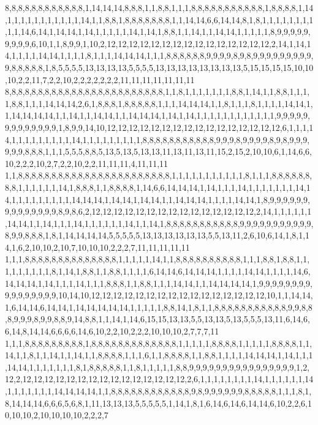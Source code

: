 8,8,8,8,8,8,8,8,8,8,8,8,1,14,14,14,8,8,8,1,1,8,8,1,1,1,8,8,8,8,8,8,8,8,8,8,8,1,8,8,8,8,1,14,1,1,1,1,1,1,1,1,1,1,1,14,1,1,8,8,1,8,8,8,8,8,8,8,1,1,14,14,6,6,14,14,8,1,8,1,1,1,1,1,1,1,1,1,1,14,6,14,1,14,14,1,14,1,1,1,1,1,14,1,14,1,8,8,1,1,14,1,1,14,14,1,1,1,1,1,8,9,9,9,9,9,9,9,9,9,6,10,1,1,8,9,9,1,10,2,12,12,12,12,12,12,12,12,12,12,12,12,12,12,12,2,14,1,14,14,1,1,1,1,14,14,1,1,1,1,8,1,1,1,14,14,14,1,1,1,8,8,8,8,8,8,9,9,9,9,8,9,8,9,9,9,9,9,9,9,9,9,9,8,8,8,8,8,1,8,5,5,5,5,13,13,13,13,5,5,5,5,13,13,13,13,13,13,13,13,5,15,15,15,15,10,10,10,2,2,11,7,2,2,10,2,2,2,2,2,2,2,11,11,11,11,11,11,11
8,8,8,8,8,8,8,8,8,8,8,8,8,8,8,8,8,8,8,8,8,8,8,8,1,1,8,1,1,1,1,1,1,1,8,8,1,14,1,1,8,8,1,1,1,1,8,8,1,1,1,14,14,14,2,6,1,8,8,8,1,8,8,8,8,8,1,1,1,14,14,14,1,1,8,1,1,1,8,1,1,1,1,14,14,1,1,14,14,14,14,1,1,14,1,1,14,14,1,1,14,14,14,1,14,1,14,1,1,1,1,1,1,1,1,1,1,1,1,9,9,9,9,9,9,9,9,9,9,9,9,9,1,8,9,9,14,10,12,12,12,12,12,12,12,12,12,12,12,12,12,12,12,12,6,1,1,1,14,1,1,1,1,1,1,1,1,1,14,1,1,1,1,1,1,1,1,1,8,8,8,8,8,8,8,8,8,8,8,9,9,9,8,9,9,9,9,8,9,8,9,9,9,9,9,9,8,8,8,1,1,1,5,5,5,8,8,5,13,5,13,5,13,13,11,13,11,13,11,15,2,15,2,10,10,6,1,14,6,6,10,2,2,2,10,2,7,2,2,10,2,2,11,11,11,4,11,11,11
1,1,8,8,8,8,8,8,8,8,8,8,8,8,8,8,8,8,8,8,8,8,8,8,8,1,1,1,1,1,1,1,1,1,1,1,8,1,1,1,8,8,8,8,8,8,8,8,1,1,1,1,1,1,14,1,8,8,8,1,1,8,8,8,8,1,14,6,6,14,14,14,1,14,1,1,1,14,1,1,1,1,1,1,1,14,14,1,1,1,1,1,1,1,1,1,14,14,14,1,14,14,1,14,14,1,1,14,14,14,1,1,1,1,14,14,1,8,9,9,9,9,9,9,9,9,9,9,9,9,9,9,8,9,8,6,2,12,12,12,12,12,12,12,12,12,12,12,12,12,12,12,2,14,1,1,1,1,1,1,14,14,1,1,14,1,1,1,14,1,1,1,1,1,1,14,1,1,14,1,8,8,8,8,8,8,8,8,8,8,8,9,9,9,9,9,9,9,9,9,9,9,8,9,9,8,8,8,1,8,1,14,14,14,14,5,5,5,5,5,13,13,13,13,13,13,5,5,13,11,2,6,10,6,14,1,8,1,14,1,6,2,10,10,2,10,7,10,10,10,2,2,2,7,11,11,11,11,11
1,1,1,8,8,8,8,8,8,8,8,8,8,8,8,8,8,1,1,1,1,1,14,1,1,8,8,8,8,8,8,8,8,8,8,1,1,1,8,8,1,8,8,1,1,1,1,1,1,1,1,1,8,1,14,1,8,8,1,1,8,8,1,1,1,1,6,14,14,6,14,14,14,1,1,1,1,14,14,1,1,1,1,14,6,14,14,14,1,14,1,1,1,14,1,1,1,8,8,8,1,1,8,8,1,1,1,14,14,1,1,14,14,14,14,1,9,9,9,9,9,9,9,9,9,9,9,9,9,9,9,9,10,14,10,12,12,12,12,12,12,12,12,12,12,12,12,12,12,12,12,10,1,1,14,14,1,6,14,14,6,14,14,1,14,14,14,14,14,1,1,1,1,1,8,8,14,1,8,1,1,8,8,8,8,8,8,8,8,8,8,8,9,9,8,8,8,9,9,9,8,9,9,8,8,9,14,8,8,1,1,14,1,14,6,15,15,13,13,5,5,13,13,5,13,5,5,5,13,11,6,14,6,6,14,8,14,14,6,6,6,6,14,6,10,2,2,10,2,2,2,10,10,10,2,7,7,7,11
1,1,1,8,8,8,8,8,8,8,8,8,1,8,8,8,8,8,8,8,8,8,8,8,8,8,1,1,1,1,1,8,8,8,8,1,1,1,1,1,8,8,8,8,1,1,14,1,1,8,1,1,14,1,1,14,1,1,8,8,8,8,1,1,1,6,1,1,8,8,8,8,1,1,8,8,1,1,1,1,14,14,14,1,14,1,1,1,14,14,1,1,1,1,1,1,1,8,1,8,8,8,8,8,1,1,8,1,1,1,1,1,8,8,9,9,9,9,9,9,9,9,9,9,9,9,9,9,9,9,1,2,12,2,12,12,12,12,12,12,12,12,12,12,12,12,12,12,12,2,6,1,1,1,1,1,1,1,1,14,1,1,1,1,1,1,14,1,1,1,1,1,1,1,14,14,14,14,1,1,8,8,8,8,8,8,8,8,8,8,8,8,9,8,9,9,9,9,9,9,8,8,8,8,8,1,1,1,8,1,8,14,14,14,6,6,6,5,6,8,1,11,13,13,13,5,5,5,5,5,1,14,1,8,1,6,14,6,14,6,14,14,6,10,2,2,6,10,10,10,2,10,10,10,10,2,2,2,7
